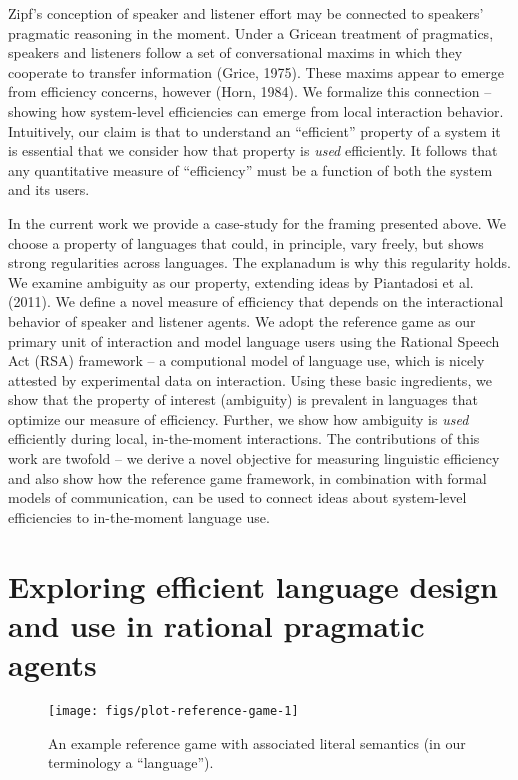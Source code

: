 \documentclass[10pt, letterpaper]{article}
\newenvironment{CodeChunk}{}{}
\begin{document}
Zipf's conception of speaker and listener effort may be connected to
speakers' pragmatic reasoning in the moment. Under a Gricean treatment
of pragmatics, speakers and listeners follow a set of conversational
maxims in which they cooperate to transfer information (Grice, 1975).
These maxims appear to emerge from efficiency concerns, however (Horn,
1984). We formalize this connection -- showing how system-level
efficiencies can emerge from local interaction behavior. Intuitively,
our claim is that to understand an ``efficient'' property of a system it
is essential that we consider how that property is \emph{used}
efficiently. It follows that any quantitative measure of ``efficiency''
must be a function of both the system and its users.\par

In the current work we provide a case-study for the framing presented
above. We choose a property of languages that could, in principle, vary
freely, but shows strong regularities across languages. The explanadum
is why this regularity holds. We examine ambiguity as our property,
extending ideas by Piantadosi et al. (2011). We define a novel measure
of efficiency that depends on the interactional behavior of speaker and
listener agents. We adopt the reference game as our primary unit of
interaction and model language users using the Rational Speech Act (RSA)
framework -- a computional model of language use, which is nicely
attested by experimental data on interaction. Using these basic
ingredients, we show that the property of interest (ambiguity) is
prevalent in languages that optimize our measure of efficiency. Further,
we show how ambiguity is \textit{used} efficiently during local,
in-the-moment interactions. The contributions of this work are twofold
-- we derive a novel objective for measuring linguistic efficiency and
also show how the reference game framework, in combination with formal
models of communication, can be used to connect ideas about system-level
efficiencies to in-the-moment language use.\par

\section{Exploring efficient language design and use in rational
pragmatic
agents}\label{exploring-efficient-language-design-and-use-in-rational-pragmatic-agents}

\begin{CodeChunk}
\begin{figure}[H]

{\centering \texttt{[image: figs/plot-reference-game-1]} 

}

\caption[An example reference game with associated literal semantics (in our terminology a ``language'')]{An example reference game with associated literal semantics (in our terminology a ``language'').}\label{fig:plot-reference-game}
\end{figure}
\end{CodeChunk}
\end{document}

